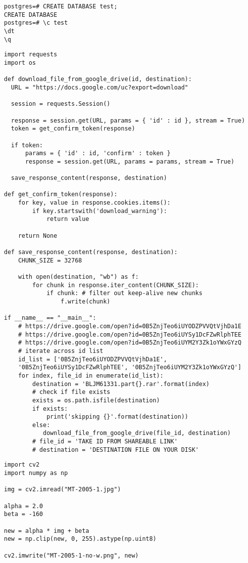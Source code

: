 \begin{verbatim}
postgres=# CREATE DATABASE test;
CREATE DATABASE
postgres=# \c test 
\dt 
\q
\end{verbatim}


\begin{lstlisting}[caption={Python Script to download from google drive}]
import requests
import os

def download_file_from_google_drive(id, destination):
  URL = "https://docs.google.com/uc?export=download"

  session = requests.Session()

  response = session.get(URL, params = { 'id' : id }, stream = True)
  token = get_confirm_token(response)

  if token:
      params = { 'id' : id, 'confirm' : token }
      response = session.get(URL, params = params, stream = True)

  save_response_content(response, destination)    

def get_confirm_token(response):
    for key, value in response.cookies.items():
        if key.startswith('download_warning'):
            return value

    return None

def save_response_content(response, destination):
    CHUNK_SIZE = 32768

    with open(destination, "wb") as f:
        for chunk in response.iter_content(CHUNK_SIZE):
            if chunk: # filter out keep-alive new chunks
                f.write(chunk)

if __name__ == "__main__":
    # https://drive.google.com/open?id=0B5ZnjTeo6iUYODZPVVQtVjhDa1E
    # https://drive.google.com/open?id=0B5ZnjTeo6iUYSy1DcFZwRlphTEE
    # https://drive.google.com/open?id=0B5ZnjTeo6iUYM2Y3Zk1oYWxGYzQ
    # iterate across id list 
    id_list = ['0B5ZnjTeo6iUYODZPVVQtVjhDa1E',
    '0B5ZnjTeo6iUYSy1DcFZwRlphTEE', '0B5ZnjTeo6iUYM2Y3Zk1oYWxGYzQ']
    for index, file_id in enumerate(id_list):
        destination = 'BLJM61331.part{}.rar'.format(index)
        # check if file exists
        exists = os.path.isfile(destination)
        if exists:
            print('skipping {}'.format(destination))
        else:
           download_file_from_google_drive(file_id, destination)
        # file_id = 'TAKE ID FROM SHAREABLE LINK'
        # destination = 'DESTINATION FILE ON YOUR DISK'
\end{lstlisting}

\begin{lstlisting}[caption={Python Script to remove watermark}]
import cv2
import numpy as np

img = cv2.imread("MT-2005-1.jpg")

alpha = 2.0
beta = -160

new = alpha * img + beta
new = np.clip(new, 0, 255).astype(np.uint8)

cv2.imwrite("MT-2005-1-no-w.png", new)
\end{lstlisting}


